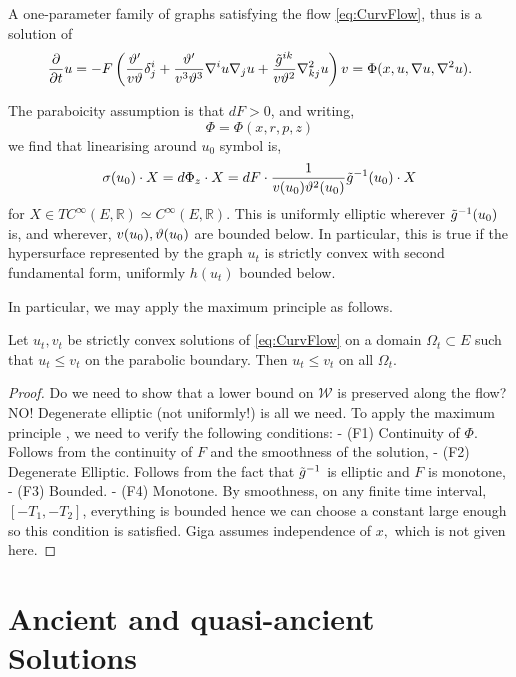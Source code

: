 \documentclass{amsart}
\begin{document}
A one-parameter family of graphs satisfying the flow \eqref{eq:CurvFlow}, thus is a solution of
\begin{equation}
\label{eq:GraphCurvFlow}
\fr{\del}{\del t}u=-F\br{\fr{\vt'}{v\vt}\d^{i}_{j}+\fr{\vt'}{v^{3}\vt^{3}}\nabla^{i}u\nabla_{j}u+\fr{\~g^{ik}}{v\vt^{2}}\nabla^{2}_{kj}u}v=\Phi(x,u,\nabla u,\nabla^{2}u).
\end{equation}

The paraboicity assumption is that \(dF > 0\), and writing,
\[
\Phi = \Phi(x, r, p, z)
\]
we find that linearising around \(u_0\) symbol is,
\[
\sigma(u_0) \cdot X = d\Phi_z \cdot X = dF \cdot \fr{1}{v(u_0) \vt^{2}(u_0)} \~g^{-1}(u_0) \cdot X
\]
for \(X \in TC^{\infty}(E, \mathbb{R}) \simeq C^{\infty}(E, \mathbb{R})\). This is uniformly elliptic wherever \(\~g^{-1}(u_0)\) is, and wherever, \(v(u_0), \vt(u_0)\) are bounded below. In particular, this is true if the hypersurface represented by the graph \(u_t\) is strictly convex with second fundamental form, uniformly \(h(u_t)\) bounded below.

In particular, we may apply the maximum principle \cite[Theorem 3.1.1]{Giga:2006} as follows.

\begin{theorem}
\label{thm:comparison}
Let \(u_t, v_t\) be strictly convex solutions of \eqref{eq:CurvFlow} on a domain \(\Omega_t \subset E\) such that \(u_t \leq v_t\) on the parabolic boundary. Then \(u_t \leq v_t\) on all \(\Omega_t\).
\end{theorem}

\begin{proof}
Do we need to show that a lower bound on \(\mathcal{W}\) is preserved along the flow? NO! Degenerate elliptic (not uniformly!) is all we need.
To apply the maximum principle \cite[Theorem 3.1.1]{Giga:2006}, we need to verify the following conditions:
- (F1) Continuity of \(\Phi\). Follows from the continuity of \(F\) and the smoothness of the solution,
- (F2) Degenerate Elliptic. Follows from the fact that \(\~g^{-1}\) is elliptic and \(F\) is monotone,
- (F3) Bounded.
- (F4) Monotone. By smoothness, on any finite time interval, \([-T_1, -T_2]\), everything is bounded hence we can choose a constant large enough so this condition is satisfied.
{\color{red} Giga assumes independence of $x,$ which is not given here.}
\end{proof}

\section{Ancient and quasi-ancient Solutions}
\label{sec:quasi_ancient}
\end{document}
